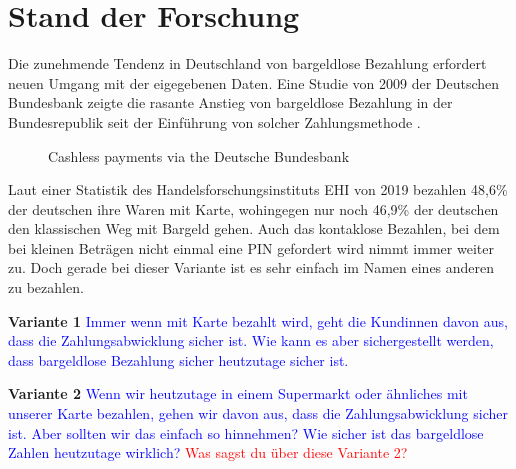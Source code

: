 \section{Stand der Forschung}


Die zunehmende Tendenz in Deutschland von bargeldlose Bezahlung erfordert neuen Umgang mit der 
eigegebenen Daten. Eine Studie von 2009 der Deutschen Bundesbank zeigte die rasante Anstieg von 
bargeldlose Bezahlung in der Bundesrepublik seit der Einführung von solcher Zahlungsmethode 
\cite{refrep:DBCP}.

\begin{figure}[htb]
    \caption{Cashless payments via the Deutsche Bundesbank}
    \label{fig:refrep_DB}
\end{figure}


Laut einer Statistik des Handelsforschungsinstituts EHI von 2019 \cite{refart:KSDL} bezahlen 48,6\% 
der deutschen ihre Waren mit Karte, wohingegen nur noch 46,9\% der deutschen den klassischen 
Weg mit Bargeld gehen. Auch das kontaklose Bezahlen, bei dem bei kleinen Beträgen nicht 
einmal eine PIN gefordert wird nimmt immer weiter zu. Doch gerade bei dieser Variante ist es 
sehr einfach im Namen eines anderen zu bezahlen.

\vspace{1cm}

\textbf{Variante 1}
\textcolor{blue}{Immer wenn mit Karte bezahlt wird, geht die Kundinnen davon aus, dass die Zahlungsabwicklung sicher ist.
Wie kann es aber sichergestellt werden, dass bargeldlose Bezahlung sicher heutzutage sicher ist.}


\textbf{Variante 2}  
\textcolor{blue}{Wenn wir heutzutage in einem Supermarkt oder ähnliches mit unserer Karte bezahlen, gehen wir davon
aus, dass die Zahlungsabwicklung sicher ist. Aber sollten wir das einfach so hinnehmen? Wie sicher
ist das bargeldlose Zahlen heutzutage wirklich? \textcolor{red}{Was sagst du über diese Variante 2?}}

